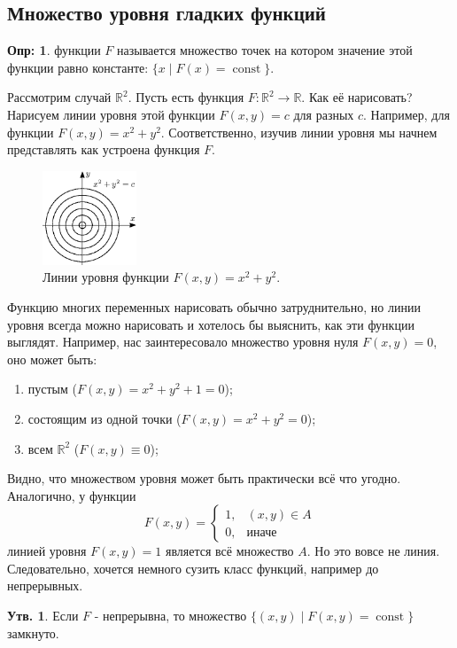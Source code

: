 \documentclass[12pt]{article}
\newcommand{\MR}{\mathbb{R}}
\theoremstyle{definition}
\newtheorem{defn}{Опр:}
\newtheorem{prop}{Утв.}
\DeclareMathOperator{\const}{\text{const}}
\begin{document}
\subsection*{Множество уровня гладких функций}
\begin{defn}
	 функции $F$ называется множество точек на котором значение этой функции равно константе: $\{x \mid F(x) = \const\}$.
\end{defn}
Рассмотрим случай $\MR^2$. Пусть есть функция $F \colon \MR^2 \to \MR$. Как её нарисовать? 
Нарисуем линии уровня этой функции $F(x,y) = c$ для разных $c$. Например, для функции $F(x,y) = x^2 + y^2$. Соответственно, изучив линии уровня мы начнем представлять как устроена функция $F$.
\begin{figure}[H]
	\centering
	\includegraphics[width=0.25\textwidth]{15_4.eps}
	\caption{Линии уровня функции $F(x,y) = x^2 + y^2$.}
	\label{15_4}
\end{figure}
Функцию многих переменных нарисовать обычно затруднительно, но линии уровня всегда можно нарисовать и хотелось бы выяснить, как эти функции выглядят. Например, нас заинтересовало множество уровня нуля $F(x,y)=0$, оно может быть:
\begin{enumerate}[label ={(\arabic*)}]
	\item пустым \big($F(x,y) = x^2 + y^2 + 1 = 0$\big);
	\item состоящим из одной точки \big($F(x,y) = x^2 + y^2 = 0$\big);
	\item всем $\MR^2$ \big($F(x,y)\equiv 0$\big);
\end{enumerate}
Видно, что множеством уровня может быть практически всё что угодно. Аналогично, у функции 
$$
	F(x,y) = \begin{cases}
			1, & (x,y) \in A \\
			0, & \text{иначе}
		\end{cases}
$$
линией уровня $F(x,y) = 1$ является всё множество $A$. Но это вовсе не линия. Следовательно, хочется немного сузить класс функций, например до непрерывных.
\begin{prop}
	Если $F$ - непрерывна, то множество $\{(x,y) \mid F(x,y) = \const \}$ замкнуто.
\end{prop}
\end{document}
